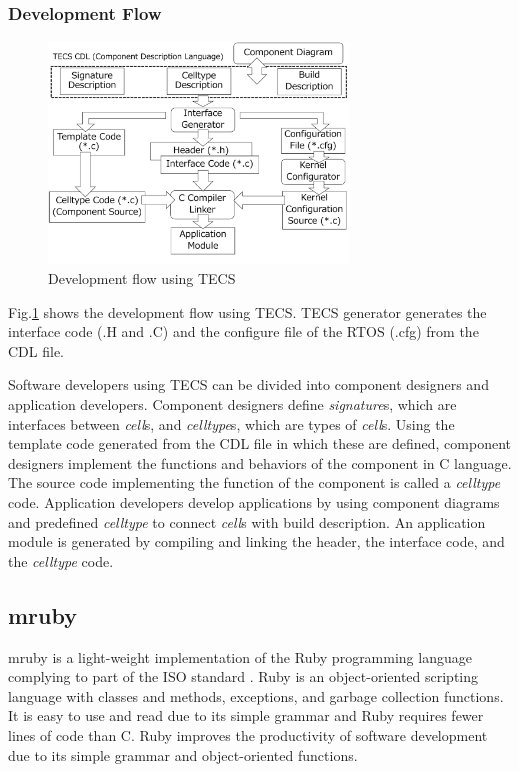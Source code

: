 \documentclass[JIP]{ipsj_v2/UTF8/ipsj}
\begin{document}
\subsubsection{Development Flow}

\begin{figure}[t]
    \centering
    \includegraphics[width=8cm,clip]{figure/TECSFlow.pdf}
    \caption{Development flow using TECS}
    \label{fig:TECSFlow}
\end{figure}

Fig.\ref{fig:TECSFlow} shows the development flow using TECS.
TECS generator generates the interface code (.H and .C) and the configure file of the RTOS (.cfg) from the CDL file.

Software developers using TECS can be divided into component designers and application developers.
Component designers define {\it signature}s, which are interfaces between {\it cell}s, and {\it celltype}s, which are types of {\it cell}s.
Using the template code generated from the CDL file in which these are defined, component designers implement the functions and behaviors of the component in C language.
The source code implementing the function of the component is called a {\it celltype} code.
Application developers develop applications by using component diagrams and predefined {\it celltype} to connect {\it cell}s with build description.
An application module is generated by compiling and linking the header, the interface code, and the {\it celltype} code.


\subsection{mruby}
\label{sec:mruby}

mruby is a light-weight implementation of the Ruby programming language complying to part of the ISO standard \cite{url:mruby}.
Ruby is an object-oriented scripting language \cite{url:Ruby} with classes and methods, exceptions, and garbage collection functions.
It is easy to use and read due to its simple grammar and Ruby requires fewer lines of code than C.
Ruby improves the productivity of software development due to its simple grammar and object-oriented functions.
\end{document}
